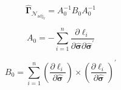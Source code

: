 \begin{equation}
    \hat{\boldsymbol{\Gamma}}_{\mathcal{N}_{\mathrm{adj}_{2}}}
    =
    A_{0}^{-1} B_{0} A_{0}^{-1}
\end{equation}

\begin{equation}
    A_{0}
    =
    -
    \sum_{i = 1}^{n}
    \frac{
      \partial
      \ell_{i}
    }{
      \partial
      \hat{\boldsymbol{\sigma}}
      \partial
      \hat{\boldsymbol{\sigma}}^{\prime}
    }
\end{equation}

\begin{equation}
  B_{0}
  =
  \sum_{i = 1}^{n} 
  \left(
  \frac{
  \partial 
  \ell_{i}
  }{
  \partial
  \hat{\boldsymbol{\sigma}}
  }
  \right) 
  \times
  \left(
  \frac{
  \partial 
  \ell_{i}
  }{
  \partial 
  \hat{\boldsymbol{\sigma}}
  }
  \right)^{\prime}
\end{equation}